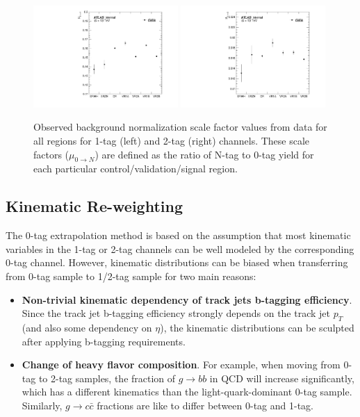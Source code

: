 \begin{figure}[htbp!]
\begin{center}
    \includegraphics[width=0.49\textwidth]{VHqqbb_PlotRegionMuSF_1tag.pdf}
    \includegraphics[width=0.49\textwidth]{VHqqbb_PlotRegionMuSF_2tag.pdf}
\end{center}
\caption{Observed background normalization scale factor values from data for all regions for 1-tag (left) and 2-tag (right) channels.
    These scale factors ($\mu_{0 \rightarrow N}$) are defined as the ratio of N-tag to 0-tag yield for each particular control/validation/signal region.
}
\label{fig:CompareMu}
\end{figure}

\subsection{Kinematic Re-weighting}
\label{sec:bkg-reweighting}
The 0-tag extrapolation method is based on the assumption that most kinematic variables in the 1-tag or 2-tag channels can be well modeled by the corresponding 0-tag channel.
However, kinematic distributions can be biased when transferring from 0-tag sample to 1/2-tag sample for two main reasons:

\begin{itemize}
    \item \textbf{Non-trivial kinematic dependency of track jets b-tagging efficiency}. Since the track jet b-tagging efficiency strongly depends on the track jet $p_{T}$ (and also some dependency on $\eta$), the kinematic distributions can be sculpted after applying b-tagging requirements.
    \item \textbf{Change of heavy flavor composition}. For example, when moving from 0-tag to 2-tag samples, the fraction of $g\rightarrow bb$ in QCD will increase significantly, which has a different kinematics than the light-quark-dominant 0-tag sample. Similarly, $g \rightarrow c\bar{c}$ fractions are like to differ between 0-tag and 1-tag.
\end{itemize}

